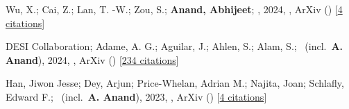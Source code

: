 \item[{\color{numcolor}\scriptsize3}] Wu, X.; Cai, Z.; Lan, T. -W.; Zou, S.; \textbf{Anand, Abhijeet}; \etal, 2024, , ArXiv () [\href{https://ui.adsabs.harvard.edu/abs/2024arXiv240717809W}{4 citations}]

\item[{\color{numcolor}\scriptsize2}] DESI Collaboration; Adame, A. G.; Aguilar, J.; Ahlen, S.; Alam, S.; \etal\ (incl.\ \textbf{A. Anand}), 2024, , ArXiv () [\href{https://ui.adsabs.harvard.edu/abs/2024arXiv240403000D}{234 citations}]

\item[{\color{numcolor}\scriptsize1}] Han, Jiwon Jesse; Dey, Arjun; Price-Whelan, Adrian M.; Najita, Joan; Schlafly, Edward F.; \etal\ (incl.\ \textbf{A. Anand}), 2023, , ArXiv () [\href{https://ui.adsabs.harvard.edu/abs/2023arXiv230611784H}{4 citations}]